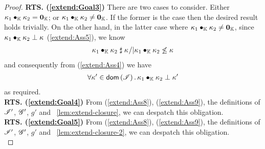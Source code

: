 \begin{lemma}
\begin{proof}
\noindent\textbf{RTS. (\ref{extend:Goal3})}
There are two cases to consider. Either $\kappa_{1} \bullet_{\mathbb{K}} \kappa_{2} = \mathbf{0}_{\mathbb{K}}$;  or $\kappa_{1} \bullet_{\mathbb{K}} \kappa_{2} \not= \mathbf{0}_{\mathbb{K}}$. If the former is the case then the desired result holds trivially. On the other hand, in the latter case where $\kappa_{1} \bullet_{\mathbb{K}} \kappa_{2} \not= \mathbf{0}_{\mathbb{K}}$, since $\kappa_{1} \bullet_{\mathbb{K}} \kappa_{2} \mathrel{\bot} \kappa_{}$ (\ref{extend:Ass5}), we know 
%
\begin{align*}
	\kappa_{1} \bullet_{\mathbb{K}} \kappa_{2} \mathrel{\sharp} \kappa_{} /| \kappa_{1} \bullet_{\mathbb{K}} \kappa_{2} \not\leq \kappa_{} 
\end{align*}
% 
and consequently from (\ref{extend:Ass4}) we have
%
\begin{align*}
	\forall \kappa_{}' \in \textsf{dom}\left( \mathscr{I} \right).\, \kappa_{1} \bullet_{\mathbb{K}} \kappa_{2} \mathrel{\bot} \kappa_{}'
\end{align*}
%
as required. \\

\noindent\textbf{RTS. (\ref{extend:Goal4})}
From (\ref{extend:Ass8}), (\ref{extend:Ass9}), the definitions of $\mathscr{I}'$, $\mathscr{G}'$, $g'$ and \lem~\ref{lem:extend-closure}, we can despatch this obligation.\\

\noindent\textbf{RTS. (\ref{extend:Goal5})}
From (\ref{extend:Ass8}), (\ref{extend:Ass9}), the definitions of $\mathscr{I}'$, $\mathscr{G}'$, $g'$ and \lem~\ref{lem:extend-closure-2}, we can despatch this obligation.\\


\end{proof}
\end{lemma}
